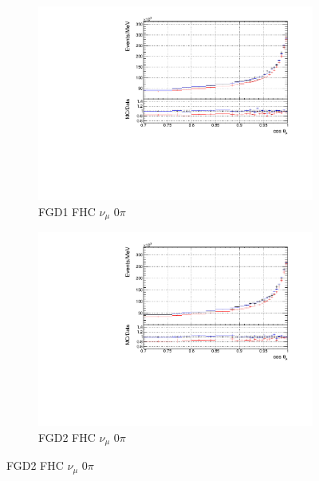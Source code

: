 \begin{figure}[!htbp]
\begin{subfigure}{0.49\textwidth}
  \centering
  \includegraphics[width=\textwidth]{figs/priorpred1D_t_FGD1_numuCC_0pi}
  \caption{FGD1 FHC $\nu_{\mu}$ 0$\pi$}
\end{subfigure}
\begin{subfigure}{0.49\textwidth}
  \centering
  \includegraphics[width=\textwidth]{figs/priorpred1D_t_FGD2_numuCC_0pi}
  \caption{FGD2 FHC $\nu_{\mu}$ 0$\pi$}
\end{subfigure}


\end{figure}
